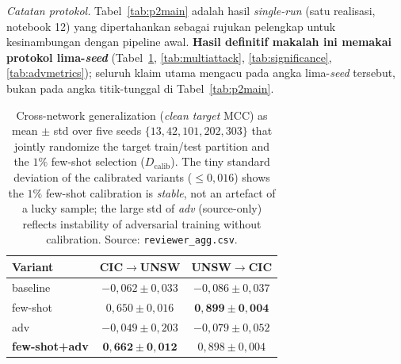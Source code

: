 \documentclass[11pt,a4paper]{article}
\begin{document}
\noindent\emph{Catatan protokol.} Tabel~\ref{tab:p2main} adalah hasil \emph{single-run}
(satu realisasi, notebook 12) yang dipertahankan sebagai rujukan pelengkap untuk
kesinambungan dengan pipeline awal. \textbf{Hasil definitif makalah ini memakai protokol
lima-\emph{seed}} (Tabel~\ref{tab:fewshot_seeds}, \ref{tab:multiattack},
\ref{tab:significance}, \ref{tab:advmetrics}); seluruh klaim utama mengacu pada angka
lima-\emph{seed} tersebut, bukan pada angka titik-tunggal di Tabel~\ref{tab:p2main}.

\begin{table}[h]
\centering
\caption{Cross-network generalization (\emph{clean target} MCC) as mean $\pm$ std
over five seeds $\{13,42,101,202,303\}$ that jointly randomize the target
train/test partition and the $1\%$ few-shot selection ($D_{\text{calib}}$). The tiny
standard deviation of the calibrated variants ($\le 0{,}016$) shows the $1\%$
few-shot calibration is \emph{stable}, not an artefact of a lucky sample; the large
std of \emph{adv} (source-only) reflects instability of adversarial training without
calibration. Source: \texttt{reviewer\_agg.csv}.}
\label{tab:fewshot_seeds}
\small
\begin{tabular}{lcc}
\toprule
Variant & CIC$\rightarrow$UNSW & UNSW$\rightarrow$CIC \\
\midrule
baseline              & $-0{,}062 \pm 0{,}033$ & $-0{,}086 \pm 0{,}037$ \\
few-shot              & $0{,}650 \pm 0{,}016$ & $\mathbf{0{,}899 \pm 0{,}004}$ \\
adv                   & $-0{,}049 \pm 0{,}203$ & $-0{,}079 \pm 0{,}052$ \\
\textbf{few-shot+adv} & $\mathbf{0{,}662 \pm 0{,}012}$ & $0{,}898 \pm 0{,}004$ \\
\bottomrule
\end{tabular}
\end{table}
\end{document}
